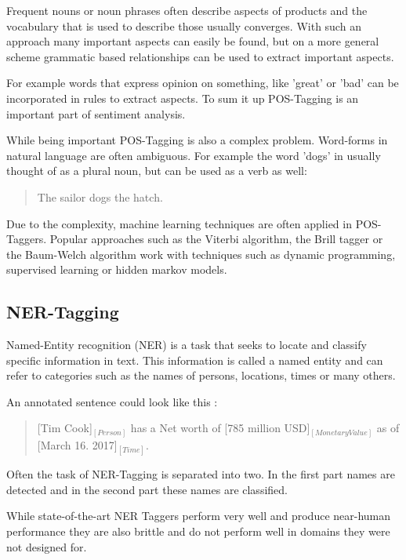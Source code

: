 \documentclass[10pt,a4paper]{article}
\begin{document}
		Frequent nouns or noun phrases often describe aspects of products and the vocabulary that is used to describe those usually converges. With such an approach many important aspects can easily be found, but on a more general scheme grammatic based relationships can be used to extract important aspects.

		For example words that express opinion on something, like 'great' or 'bad' can be incorporated in rules to extract aspects. To sum it up POS-Tagging is an important part of sentiment analysis.
		
		While being important POS-Tagging is also a complex problem. Word-forms in natural language are often ambiguous. For example the word 'dogs' in usually thought of as a plural noun, but can be used as a verb as well:

		\begin{quote}
			The sailor dogs the hatch.
		\end{quote}

		Due to the complexity, machine learning techniques are often applied in POS-Taggers. Popular approaches such as the Viterbi algorithm, the Brill tagger or the Baum-Welch algorithm work with techniques such as dynamic programming, supervised learning or hidden markov models.
		
		\subsection{NER-Tagging}
		
		Named-Entity recognition (NER) is a task that seeks to locate and classify specific information in text. This information is called a named entity and can refer to categories such as the names of persons, locations, times or many others.

		An annotated sentence could look like this :

		\begin{quote}
			[Tim Cook]$_{[Person]}$ has a Net worth of [785 million USD]$_{[Monetary Value]}$ as of [March 16. 2017]$_{[Time]}$.
		\end{quote}
		
		Often the task of NER-Tagging is separated into two. In the first part names are detected and in the second part these names are classified. 
		
		While state-of-the-art NER Taggers perform very well and produce near-human performance they are also brittle and do not perform well in domains they were not designed for.
\end{document}
